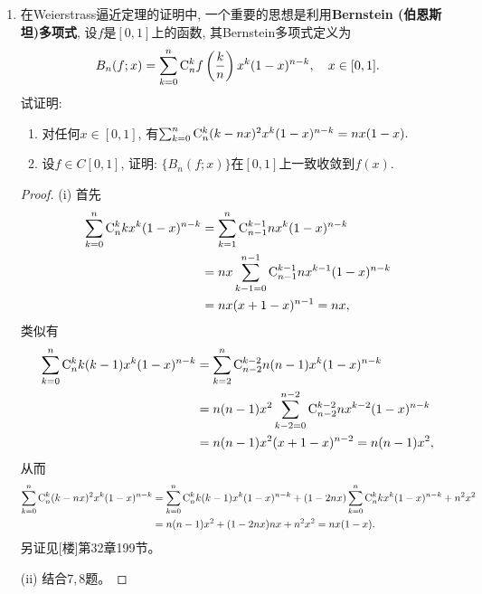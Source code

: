 \begin{quizb}
\begin{enumerate}
\item 在Weierstrass逼近定理的证明中, 一个重要的思想是利用\textbf{Bernstein (伯恩斯坦)多项式}, 
设\(f\)是\([0,1]\)上的函数, 其Bernstein多项式定义为
\[B_n(f;x)=\sum_{k=0}^{n}{\rm C}_n^kf\left(\frac{k}{n}\right)x^k(1-x)^{n-k},\quad x\in[0,1].\]
试证明:\begin{enumerate}[label=(\roman*)]
\item 对任何\(x\in[0,1]\), 有\(\sum_{k=0}^{n}{\rm C}_n^k(k-nx)^2x^k(1-x)^{n-k}=nx(1-x).\)
\item 设\(f\in C[0,1]\), 证明: \(\{B_n(f;x)\}\)在\([0,1]\)上一致收敛到\(f(x)\).
\end{enumerate}
\begin{proof}
    (i) 首先\begin{align*}\sum_{k=0}^{n}{\rm C}_n^kkx^k(1-x)^{n-k}
    &=\sum_{k=1}^{n}{\rm C}_{n-1}^{k-1}nx^k(1-x)^{n-k}\\
    &=nx\sum_{k-1=0}^{n-1}{\rm C}_{n-1}^{k-1}nx^{k-1}(1-x)^{n-k}\\
    &=nx(x+1-x)^{n-1}=nx,\end{align*}
    类似有\begin{align*}\sum_{k=0}^{n}{\rm C}_n^kk(k-1)x^k(1-x)^{n-k}
    &=\sum_{k=2}^{n}{\rm C}_{n-2}^{k-2}n(n-1)x^k(1-x)^{n-k}\\
    &=n(n-1)x^2\sum_{k-2=0}^{n-2}{\rm C}_{n-2}^{k-2}nx^{k-2}(1-x)^{n-k}\\
    &=n(n-1)x^2(x+1-x)^{n-2}=n(n-1)x^2,\end{align*}
    从而\begin{align*}\sum_{k=0}^{n}{\rm C}_n^k(k-nx)^2x^k(1-x)^{n-k}
    &=\sum_{k=0}^{n}{\rm C}_n^kk(k-1)x^k(1-x)^{n-k}
    +(1-2nx)\sum_{k=0}^{n}{\rm C}_n^kkx^k(1-x)^{n-k}+n^2x^2\\
    &=n(n-1)x^2+(1-2nx)nx+n^2x^2=nx(1-x).\end{align*}
    另证见[楼]第32章199节。
    
    (ii) 结合7,\,8题。
\end{proof}


\end{enumerate}
\end{quizb}
